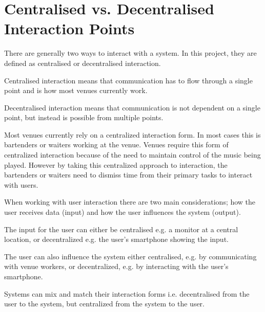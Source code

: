 \section{Centralised vs. Decentralised Interaction Points}
There are generally two ways to interact with a system. In this project, they are defined as centralised or decentralised interaction.

Centralised interaction means that communication has to flow through a single point and is how most venues currently work.

Decentralised interaction means that communication is not dependent on a single point, but instead is possible from multiple points.

Most venues currently rely on a centralized interaction form. In most cases this is bartenders or waiters working at the venue. Venues require this form of centralized interaction because of the need to maintain control of the music being played. However by taking this centralized approach to interaction, the bartenders or waiters need to dismiss time from their primary tasks to interact with users.

When working with user interaction there are two main considerations; how the user receives data (input) and how the user influences the system (output).


The input for the user can either be centralised e.g. a monitor at a central location, or decentralized e.g. the user's smartphone showing the input.

The user can also influence the system either centralised, e.g. by communicating with venue workers, or decentralized, e.g. by interacting with the user's smartphone.

Systems can mix and match their interaction forms i.e. decentralised from the user to the system, but centralized from the system to the user.


